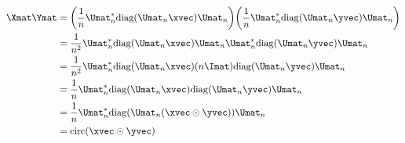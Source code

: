 \begin{itemize}[leftmargin=13pt]
\begin{align}
      \Xmat \Ymat &= \left( \frac{1}{n} \Umat_n^* \diag(\Umat_n \xvec) \Umat_n \right) \left( \frac{1}{n} \Umat_n^* \diag(\Umat_n \yvec) \Umat_n \right) \\
      &= \frac{1}{n^2}  \Umat_n^* \diag(\Umat_n \xvec) \Umat_n \Umat_n^* \diag(\Umat_n \yvec) \Umat_n  \\
      &= \frac{1}{n^2}  \Umat_n^* \diag(\Umat_n \xvec) (n \Imat) \diag(\Umat_n \yvec) \Umat_n  \\
      &= \frac{1}{n}  \Umat_n^* \diag(\Umat_n \xvec) \diag(\Umat_n \yvec) \Umat_n  \\
      &= \frac{1}{n}  \Umat_n^* \diag(\Umat_n (\xvec \odot \yvec)) \Umat_n  \\
      &= \circulant(\xvec \odot \yvec)
    \end{align}
\end{itemize}

\endgroup



